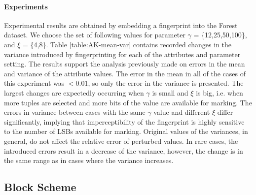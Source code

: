 \paragraph{Experiments}
Experimental results are obtained by embedding a fingerprint into the Forest dataset. 
We choose the set of following values for parameter $\gamma$ = \{12,25,50,100\}, and $\xi$ = \{4,8\}. 
Table \ref{table:AK-mean-var} contains recorded changes in the variance introduced by fingerprinting for each of the attributes and parameter setting.
The results support the analysis previously made on errors in the mean and variance of the attribute values.
The error in the mean in all of the cases of this experiment was $<0.01$, so only the error in the variance is presented.
The largest changes are expectedly occurring when $\gamma$ is small and $\xi$ is big, i.e. when more tuples are selected and more bits of the value are available for marking. 
The errors in variance between cases with the same $\gamma$ value and different $\xi$ differ significantly, implying that imperceptibility of the fingerprint is highly sensitive to the number of LSBs available for marking.
Original values of the variances, in general, do not affect the relative error of perturbed values.  
In rare cases, the introduced errors result in a decrease of the variance, however, the change is in the same range as in cases where the variance increases. 


\subsection{Block Scheme}

